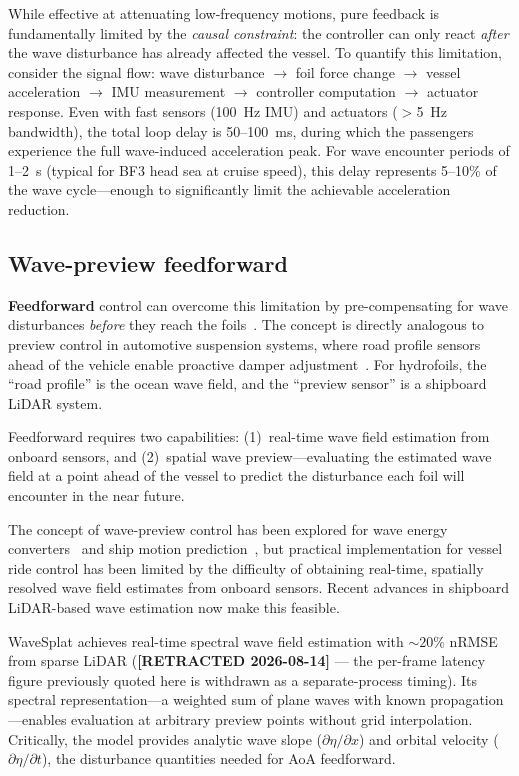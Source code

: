 \documentclass[review]{elsarticle}
\begin{document}
While effective at attenuating low-frequency motions, pure feedback
is fundamentally limited by the \emph{causal constraint}: the controller
can only react \emph{after} the wave disturbance has already affected
the vessel.
To quantify this limitation, consider the signal flow:
wave disturbance $\to$ foil force change $\to$ vessel acceleration
$\to$ IMU measurement $\to$ controller computation $\to$ actuator
response.
Even with fast sensors (100~Hz IMU) and actuators ($>$5~Hz bandwidth),
the total loop delay is 50--100~ms, during which the passengers
experience the full wave-induced acceleration peak.
For wave encounter periods of 1--2~s (typical for BF3 head sea at
cruise speed), this delay represents 5--10\% of the wave cycle---enough
to significantly limit the achievable acceleration reduction.

\subsection{Wave-preview feedforward}

\textbf{Feedforward} control can overcome this limitation by
pre-compensating for wave disturbances \emph{before} they reach the
foils~\citep{hrovat1997, korde2015}.
The concept is directly analogous to preview control in automotive
suspension systems, where road profile sensors ahead of the vehicle
enable proactive damper adjustment~\citep{hrovat1997}.
For hydrofoils, the ``road profile'' is the ocean wave field,
and the ``preview sensor'' is a shipboard LiDAR system.

Feedforward requires two capabilities:
(1)~real-time wave field estimation from onboard sensors, and
(2)~spatial wave preview---evaluating the estimated wave field at a point
ahead of the vessel to predict the disturbance each foil will encounter
in the near future.

The concept of wave-preview control has been explored for wave energy
converters~\citep{korde2015} and ship motion
prediction~\citep{cummins2017, belleter2015}, but practical
implementation for vessel ride control has been limited by the
difficulty of obtaining real-time, spatially resolved wave field
estimates from onboard sensors.
Recent advances in shipboard LiDAR-based wave estimation
now make this feasible.

WaveSplat \citep{park2026wavesplat} achieves real-time
spectral wave field estimation with ${\sim}20\%$ nRMSE from sparse LiDAR
(\textbf{[RETRACTED 2026-08-14]} --- the per-frame latency figure previously
quoted here is withdrawn as a separate-process timing).
Its spectral representation---a weighted sum of plane
waves with known propagation---enables evaluation at
arbitrary preview points without grid interpolation.
Critically, the model provides analytic wave
slope ($\partial\eta/\partial x$) and orbital velocity
($\partial\eta/\partial t$), the disturbance quantities
needed for AoA feedforward.
\end{document}
